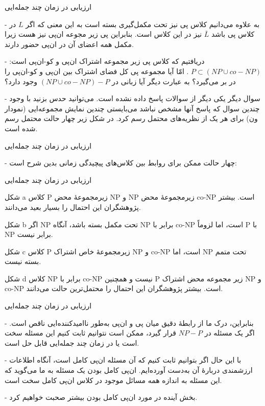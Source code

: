 \begin{itemframe}{ارزیابی در زمان چند جمله‌ایی}
\item [-]
به علاوه می‌دانیم کلاس پی نیز تحت مکمل‌گیری بسته است به این معنی که اگر $ L $ در کلاس پی باشد $ \overbar{L} $ نیز در این کلاس است. بنابراین پی زیر مجوعه ان‌پی نیز هست زیرا مکمل همه اعضای آن در ان‌پی حضور دارند.
\item [-]
دریافتیم که کلاس پی زیر مجموعه اشتراک ان‌پی و کو-ان‌پی است: $ P \subset (NP \cup co-NP)$ . امّا آیا مجموعه پی کل فضای اشتراک بین ان‌پی و کو-ان‌پی را در بر می‌گیرد؟ به عبارت دیگر آیا زبانی در $(NP \cup co-NP) -P $ وجود دارد؟
\item [-]
سوال دیگر یکی دیگر از سوالات پاسخ داده نشده است. می‌توانید حدس بزنید با وجود چندین سوال که پاسخ آنها مشخص نباشد می‌بایستی چندین نمایش مجموعه‌ایی (نمودار ون) برای هر یک از نظریه‌های محتمل رسم کرد. در شکل زیر چهار حالت محتمل رسم شده است.
\end{itemframe}


\begin{itemframe}{ارزیابی در زمان چند جمله‌ایی}
\item [-]
چهار حالت ممکن برای روابط بین کلاس‌های پیچیدگی زمانی بدین شرح است:
\end{itemframe}


\begin{itemframe}{ارزیابی در زمان چند جمله‌ایی}
\item[شکل a]
کلاس P زیرمجموعهٔ محض NP و NP زیرمجموعهٔ محض co-NP است. بیشتر پژوهشگران این احتمال را بسیار بعید می‌دانند.
\item[شکل b]
اگر NP تحت مکمل بسته باشد، آنگاه NP برابر با co-NP است، اما لزوماً P با NP برابر نیست.
\item[شکل c]
کلاس P زیرمجموعهٔ خاص اشتراک NP و co-NP است، اما NP تحت متمم بسته نیست.
\item[شکل d]
کلاس NP برابر با co-NP نیست و همچنین P زیر مجموعه محض اشتراک NP و co-NP است. بیشتر پژوهشگران این احتمال را محتمل‌ترین حالت می‌دانند.
\end{itemframe}


\begin{itemframe}{ارزیابی در زمان چند جمله‌ایی}
\item[-]
بنابراین، درک ما از رابطهٔ دقیق میان پی و ان‌پی به‌طور ناامیدکننده‌ایی ناقص است. اگر یک مسئله در $ NP - P $ قرار گیرد، ممکن است نتوانیم ثابت کنیم این مسئله سخت است یا در زمان چند جمله‌ایی قابل حل است.
\item[-]
با این حال اگر بتوانیم ثابت کنیم که آن مسئله ان‌پی کامل است، آنگاه اطلاعات ارزشمندی دربارهٔ آن به‌دست آورده‌ایم. ان‌پی کامل بودن یک مسئله به ما می‌گوید که این مسئله به اندازه همه مسائل موجود در کلاس ان‌پی کامل سخت است.
\item[-]
بخش آینده در مورد  ان‌پی کامل بودن بیشتر صحبت خواهیم کرد.
\end{itemframe}

